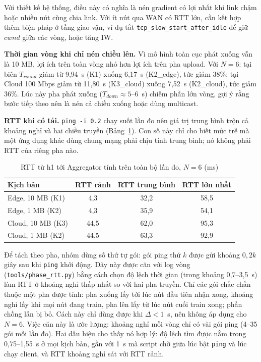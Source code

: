 Với thiết kế hệ thống, điều này có nghĩa là nén gradient có lợi nhất khi link chậm hoặc nhiều nút cùng chia link. Với ít nút qua WAN có RTT lớn, cần kết hợp thêm biện pháp ở tầng giao vận, ví dụ tắt \nolinkurl{tcp_slow_start_after_idle} để giữ $cwnd$ giữa các vòng, hoặc tăng IW.

\textbf{Thời gian vòng khi chỉ nén chiều lên.} Vì mô hình toàn cục phát xuống vẫn là 10 MB, lợi ích trên toàn vòng nhỏ hơn lợi ích trên pha upload. Với $N = 6$: tại biên $T_{round}$ giảm từ 9{,}94~s (K1) xuống 6{,}17~s (K2\_edge), tức giảm 38\%; tại Cloud 100 Mbps giảm từ 11{,}80~s (K3\_cloud) xuống 7{,}52~s (K2\_cloud), tức giảm 36\%. Lúc này pha phát xuống ($T_{down} \approx 5$--6~s) chiếm phần lớn vòng, gợi ý rằng bước tiếp theo nên là nén cả chiều xuống hoặc dùng multicast.

\textbf{RTT khi có tải.} \texttt{ping -i 0.2} chạy suốt lần đo nên giá trị trung bình trộn cả khoảng nghỉ và hai chiều truyền (Bảng~\ref{tab:q2rtt}). Con số này chỉ cho biết mức trễ mà một ứng dụng khác dùng chung mạng phải chịu tính trung bình; nó không phải RTT của riêng pha nào.

\begin{table}[H]
    \centering
    \caption{RTT từ h1 tới Aggregator tính trên toàn bộ lần đo, $N = 6$ (ms)}
    \label{tab:q2rtt}
    \begin{tabular}{l c c c}
        \toprule
        \textbf{Kịch bản} & \textbf{RTT rảnh} & \textbf{RTT trung bình} & \textbf{RTT lớn nhất} \\
        \midrule
        Edge, 10 MB (K1) & 4,3 & 32,2 & 58,5 \\
        Edge, 1 MB (K2) & 4,3 & 35,9 & 54,1 \\
        Cloud, 10 MB (K3) & 44,5 & 62,0 & 95,3 \\
        Cloud, 1 MB (K2) & 44,5 & 63,3 & 92,9 \\
        \bottomrule
    \end{tabular}
\end{table}

Để tách theo pha, nhóm dùng số thứ tự gói: gói ping thứ $k$ được gửi khoảng $0{,}2k$ giây sau khi \texttt{ping} khởi động. Dãy này được căn với log vòng (\nolinkurl{tools/phase_rtt.py}) bằng cách chọn độ lệch thời gian (trong khoảng 0{,}7--3{,}5~s) làm RTT ở khoảng nghỉ thấp nhất so với hai pha truyền. Chỉ các gói chắc chắn thuộc một pha được tính: pha xuống lấy tới lúc nút đầu tiên nhận xong, khoảng nghỉ lấy khi mọi nút đang train, pha lên lấy từ lúc nút cuối train xong; phần chồng lấn bị bỏ. Cách này chỉ dùng được khi $\Delta < 1$~s, nên không áp dụng cho $N = 6$. Việc căn này là ước lượng: khoảng nghỉ mỗi vòng chỉ có vài gói ping (4--35 gói mỗi lần đo). Hai dấu hiệu cho thấy nó hợp lý: độ lệch tìm được nằm trong 0{,}75--1{,}55~s ở mọi kịch bản, gần với 1~s mà script chờ giữa lúc bật \texttt{ping} và lúc chạy client, và RTT khoảng nghỉ sát với RTT rảnh.

